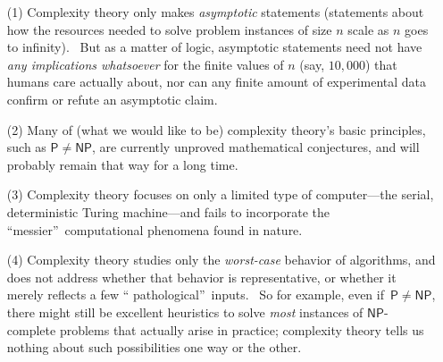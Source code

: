 \documentclass[11pt,onecolumn]{article}%
\begin{document}
\begin{enumerate}
\item[(1)] Complexity theory only makes \textit{asymptotic} statements
(statements about how the resources needed to solve problem instances of size
$n$ scale as $n$ goes to infinity). \ But as a matter of logic, asymptotic
statements need not have \textit{any implications whatsoever} for the finite
values of $n$ (say, $10,000$) that humans care actually about, nor can any
finite amount of experimental data confirm or refute an asymptotic claim.

\item[(2)] Many of (what we would like to be) complexity theory's basic
principles, such as $\mathsf{P}\neq\mathsf{NP}$, are currently unproved
mathematical conjectures, and will probably remain that way for a long time.

\item[(3)] Complexity theory focuses on only a limited type of computer---the
serial, deterministic Turing machine---and fails to incorporate the
\textquotedblleft messier\textquotedblright\ computational phenomena found in nature.

\item[(4)] Complexity theory studies only the \textit{worst-case} behavior of
algorithms, and does not address whether that behavior is representative, or
whether it merely reflects a few \textquotedblleft
pathological\textquotedblright\ inputs. \ So for example, even if\ $\mathsf{P}%
\neq\mathsf{NP}$, there might still be excellent heuristics to solve
\textit{most} instances of $\mathsf{NP}$-complete problems that actually arise
in practice; complexity theory tells us nothing about such possibilities one
way or the other.
\end{enumerate}
\end{document}
